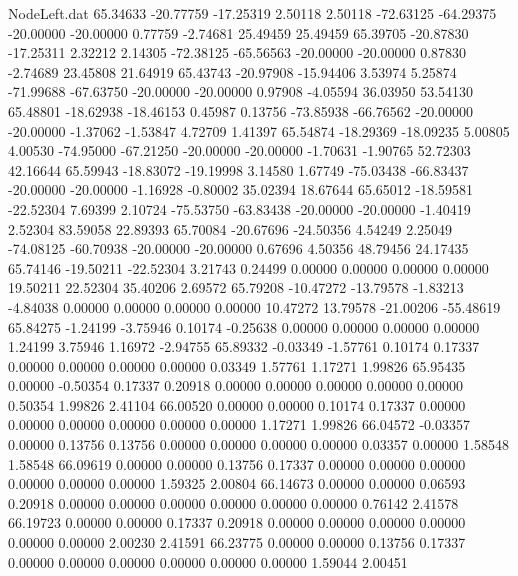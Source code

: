 \begin{filecontents}{NodeLeft.dat}
  65.34633  -20.77759  -17.25319     2.50118    2.50118  -72.63125  -64.29375  -20.00000  -20.00000    0.77759   -2.74681   25.49459   25.49459
  65.39705  -20.87830  -17.25311     2.32212    2.14305  -72.38125  -65.56563  -20.00000  -20.00000    0.87830   -2.74689   23.45808   21.64919
  65.43743  -20.97908  -15.94406     3.53974    5.25874  -71.99688  -67.63750  -20.00000  -20.00000    0.97908   -4.05594   36.03950   53.54130
  65.48801  -18.62938  -18.46153     0.45987    0.13756  -73.85938  -66.76562  -20.00000  -20.00000   -1.37062   -1.53847    4.72709    1.41397
  65.54874  -18.29369  -18.09235     5.00805    4.00530  -74.95000  -67.21250  -20.00000  -20.00000   -1.70631   -1.90765   52.72303   42.16644
  65.59943  -18.83072  -19.19998     3.14580    1.67749  -75.03438  -66.83437  -20.00000  -20.00000   -1.16928   -0.80002   35.02394   18.67644
  65.65012  -18.59581  -22.52304     7.69399    2.10724  -75.53750  -63.83438  -20.00000  -20.00000   -1.40419    2.52304   83.59058   22.89393
  65.70084  -20.67696  -24.50356     4.54249    2.25049  -74.08125  -60.70938  -20.00000  -20.00000    0.67696    4.50356   48.79456   24.17435
  65.74146  -19.50211  -22.52304     3.21743    0.24499    0.00000    0.00000    0.00000    0.00000   19.50211   22.52304   35.40206    2.69572
  65.79208  -10.47272  -13.79578    -1.83213   -4.84038    0.00000    0.00000    0.00000    0.00000   10.47272   13.79578  -21.00206  -55.48619
  65.84275   -1.24199   -3.75946     0.10174   -0.25638    0.00000    0.00000    0.00000    0.00000    1.24199    3.75946    1.16972   -2.94755
  65.89332   -0.03349   -1.57761     0.10174    0.17337    0.00000    0.00000    0.00000    0.00000    0.03349    1.57761    1.17271    1.99826
  65.95435    0.00000   -0.50354     0.17337    0.20918    0.00000    0.00000    0.00000    0.00000    0.00000    0.50354    1.99826    2.41104
  66.00520    0.00000    0.00000     0.10174    0.17337    0.00000    0.00000    0.00000    0.00000    0.00000    0.00000    1.17271    1.99826
  66.04572   -0.03357    0.00000     0.13756    0.13756    0.00000    0.00000    0.00000    0.00000    0.03357    0.00000    1.58548    1.58548
  66.09619    0.00000    0.00000     0.13756    0.17337    0.00000    0.00000    0.00000    0.00000    0.00000    0.00000    1.59325    2.00804
  66.14673    0.00000    0.00000     0.06593    0.20918    0.00000    0.00000    0.00000    0.00000    0.00000    0.00000    0.76142    2.41578
  66.19723    0.00000    0.00000     0.17337    0.20918    0.00000    0.00000    0.00000    0.00000    0.00000    0.00000    2.00230    2.41591
  66.23775    0.00000    0.00000     0.13756    0.17337    0.00000    0.00000    0.00000    0.00000    0.00000    0.00000    1.59044    2.00451

\end{filecontents}

